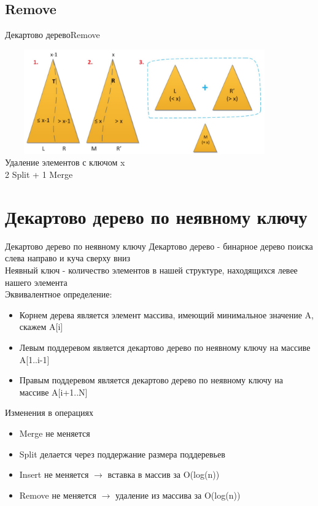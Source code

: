 \documentclass[10pt]{beamer}
\begin{document}
\subsection{Remove}
\begin{frame}[fragile]{Декартово дерево}{Remove}
\begin{center}
\includegraphics[width=12cm, height=4.5cm]{Term_1/Source/Pirctures/treap_remove.jpg}\\
Удаление элементов с ключом x\\
2 Split + 1 Merge
\end{center}
\end{frame}

\section{Декартово дерево по неявному ключу}
\begin{frame}[fragile]{Декартово дерево по неявному ключу}
Декартово дерево - бинарное дерево поиска слева направо и куча сверху вниз\\
Неявный ключ - количество элементов в нашей структуре, находящихся левее нашего элемента\\
Эквивалентное определение:
\begin{itemize}
    \item Корнем дерева является элемент массива, имеющий минимальное значение A, скажем A[i]
    \item Левым поддеревом является декартово дерево по неявному ключу на массиве A[1..i-1]
    \item Правым поддеревом является декартово дерево по неявному ключу на массиве A[i+1..N]
\end{itemize}
\end{frame}

\begin{frame}[fragile]{Изменения в операциях}
\begin{itemize}
    \item Merge не меняется
    \item Split делается через поддержание размера поддеревьев
    \item Insert не меняется $\rightarrow$ вставка в массив за O(log(n))
    \item Remove не меняется $\rightarrow$ удаление из массива за O(log(n))
\end{itemize}
\end{frame}
\end{document}
